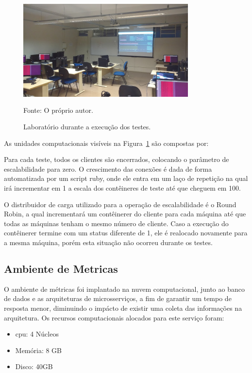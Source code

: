 \begin{figure}[htb!]
  \caption{Laboratório durante a execução dos testes.}
  \label{fig:laboratorio}
  \includegraphics[width=0.8\textwidth]{figuras/network/lab.jpg}
  \centering

  Fonte: O próprio autor.
\end{figure}

As unidades computacionais visíveis na Figura~\ref{fig:laboratorio} são compostas por:



Para cada teste, todos os clientes são encerrados, colocando o parâmetro de escalabilidade para zero.
%
O crescimento das conexões é dada de forma automatizada por um script ruby, onde ele entra em um laço de repetição na qual irá incrementar em 1 a escala dos contêineres de teste até que cheguem em 100.

O distribuidor de carga utilizado para a operação de escalabilidade é o Round Robin, a qual incrementará um contêinerer do cliente para cada máquina até que todas as máquinas tenham o mesmo número de cliente.
%
Caso a execução do contêinerer termine com um status diferente de 1, ele é realocado novamente para a mesma máquina, porém esta situação não ocorreu durante os testes.

\subsection{Ambiente de Metricas}
\label{sec:ambiente_met}

O ambiente de métricas foi implantado na nuvem computacional, junto ao banco de dados e as arquiteturas de microsserviços, a fim de garantir um tempo de resposta menor, diminuindo o impácto de existir uma coleta das informações na arquitetura.
%
Os recursos computacionais alocados para este serviço foram:

\begin{itemize}
  \item \ac{cpu}: 4 Núcleos
  \item Memória: 8 GB
  \item Disco: 40GB
\end{itemize}

